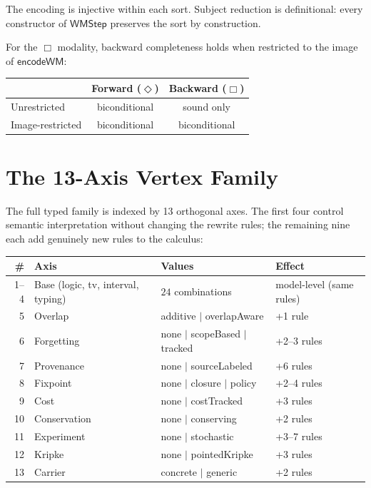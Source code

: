 \documentclass[11pt,openany]{report}
\begin{document}
\noindent
The encoding is injective within each sort.  Subject reduction is
definitional: every constructor of $\mathsf{WMStep}$ preserves the
sort by construction.

For the $\Box$ modality, backward completeness holds when restricted
to the image of $\mathsf{encodeWM}$:

\begin{center}
\begin{tabular}{lcc}
\toprule
& Forward ($\Diamond$) & Backward ($\Box$) \\
\midrule
Unrestricted & biconditional & sound only \\
Image-restricted & biconditional & biconditional \\
\bottomrule
\end{tabular}
\end{center}


\section{The 13-Axis Vertex Family}
\label{sec:wm-13axis}

The full typed family is indexed by 13 orthogonal axes.  The first
four control semantic interpretation without changing the rewrite
rules; the remaining nine each add genuinely new rules to the
calculus:

\begin{center}
{\footnotesize
\begin{tabular}{rlll}
\toprule
\textbf{\#} & \textbf{Axis} & \textbf{Values} & \textbf{Effect} \\
\midrule
1--4 & Base (logic, tv, interval, typing)
     & $24$ combinations & model-level (same rules) \\
5 & Overlap & additive $|$ overlapAware & +1 rule \\
6 & Forgetting & none $|$ scopeBased $|$ tracked & +2--3 rules \\
7 & Provenance & none $|$ sourceLabeled & +6 rules \\
8 & Fixpoint & none $|$ closure $|$ policy & +2--4 rules \\
9 & Cost & none $|$ costTracked & +3 rules \\
10 & Conservation & none $|$ conserving & +2 rules \\
11 & Experiment & none $|$ stochastic & +3--7 rules \\
12 & Kripke & none $|$ pointedKripke & +3 rules \\
13 & Carrier & concrete $|$ generic & +2 rules \\
\bottomrule
\end{tabular}}
\end{center}
\end{document}
